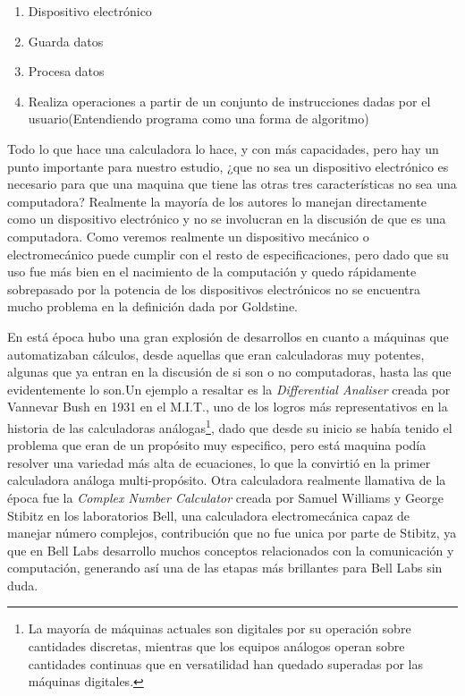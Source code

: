 \documentclass[letterpaper,12pt,oneside]{book}
\begin{document}
		\begin{enumerate}
			\item Dispositivo electrónico 
			\item Guarda datos
			\item Procesa datos
			\item Realiza operaciones a partir de un conjunto de instrucciones dadas por el usuario(Entendiendo programa como una forma de algoritmo)
		\end{enumerate}
		
		Todo lo que hace una calculadora lo hace, y con más capacidades, pero hay un punto importante para nuestro estudio, ¿que no sea un dispositivo electrónico es
		necesario para que una maquina que tiene las otras tres características	no sea una computadora? Realmente la mayoría de los autores lo manejan directamente
		como un dispositivo electrónico y no se involucran en la discusión de que es una computadora. Como veremos realmente un dispositivo mecánico o electromecánico
		puede cumplir con el resto de especificaciones, pero dado que su uso fue más bien en el nacimiento de la computación y quedo rápidamente sobrepasado
		por la potencia de los dispositivos electrónicos no se encuentra mucho problema en la definición dada por Goldstine.
		
		
		En está época hubo una gran explosión de desarrollos en cuanto a máquinas que automatizaban cálculos, desde
		aquellas que eran calculadoras muy potentes, algunas que ya entran en la discusión de si son o no computadoras, hasta las que evidentemente lo son.Un ejemplo a 
		resaltar es la \textit{Differential Analiser} creada por Vannevar Bush en 1931 en el M.I.T., uno de los logros más representativos en la historia de las calculadoras
		análogas\footnote{La mayoría de máquinas actuales son digitales por su operación sobre cantidades discretas, mientras que los equipos análogos operan
		sobre cantidades continuas que en versatilidad han quedado superadas por las máquinas digitales.}, dado que desde su inicio se había tenido el problema que eran de un 
		propósito muy especifico, pero está maquina podía resolver una variedad
		más alta de ecuaciones, lo que la convirtió en la primer calculadora análoga multi-propósito\cite[p.158]{ifrah_universal_2001}.
		Otra calculadora realmente llamativa de la época fue la \textit{Complex Number Calculator} creada por		
		Samuel Williams y George Stibitz en los laboratorios Bell, una calculadora electromecánica capaz
		de manejar número complejos, contribución que no fue unica por parte de Stibitz, ya que en Bell Labs desarrollo muchos conceptos relacionados con la
		comunicación y computación, generando así una de las etapas más brillantes para Bell Labs sin duda\cite[p.207]{ifrah_universal_2001}.
		
\end{document}
